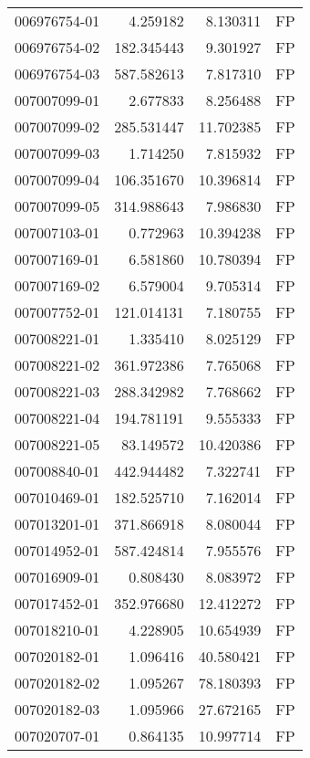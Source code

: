 \begin{tabular}{lrrl}
006976754-01 &    4.259182 &       8.130311 &   FP \\
006976754-02 &  182.345443 &       9.301927 &   FP \\
006976754-03 &  587.582613 &       7.817310 &   FP \\
007007099-01 &    2.677833 &       8.256488 &   FP \\
007007099-02 &  285.531447 &      11.702385 &   FP \\
007007099-03 &    1.714250 &       7.815932 &   FP \\
007007099-04 &  106.351670 &      10.396814 &   FP \\
007007099-05 &  314.988643 &       7.986830 &   FP \\
007007103-01 &    0.772963 &      10.394238 &   FP \\
007007169-01 &    6.581860 &      10.780394 &   FP \\
007007169-02 &    6.579004 &       9.705314 &   FP \\
007007752-01 &  121.014131 &       7.180755 &   FP \\
007008221-01 &    1.335410 &       8.025129 &   FP \\
007008221-02 &  361.972386 &       7.765068 &   FP \\
007008221-03 &  288.342982 &       7.768662 &   FP \\
007008221-04 &  194.781191 &       9.555333 &   FP \\
007008221-05 &   83.149572 &      10.420386 &   FP \\
007008840-01 &  442.944482 &       7.322741 &   FP \\
007010469-01 &  182.525710 &       7.162014 &   FP \\
007013201-01 &  371.866918 &       8.080044 &   FP \\
007014952-01 &  587.424814 &       7.955576 &   FP \\
007016909-01 &    0.808430 &       8.083972 &   FP \\
007017452-01 &  352.976680 &      12.412272 &   FP \\
007018210-01 &    4.228905 &      10.654939 &   FP \\
007020182-01 &    1.096416 &      40.580421 &   FP \\
007020182-02 &    1.095267 &      78.180393 &   FP \\
007020182-03 &    1.095966 &      27.672165 &   FP \\
007020707-01 &    0.864135 &      10.997714 &   FP \\

\end{tabular}
